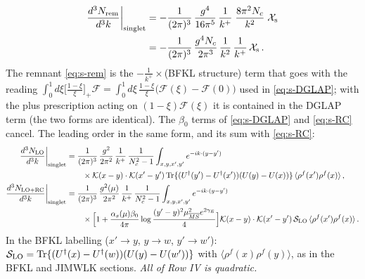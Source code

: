 {\begin{align}
\frac{d^{3}N_{\rm rem}}{d^{3}k}\bigg|_{\rm singlet}&=-\frac{1}{(2\pi)^{3}}\,\frac{g^{4}}{16\pi^{5}}\,\frac{1}{k^{+}}\;\frac{8\pi^{2}N_{c}}{k^{2}}\;\mathcal{X}_{\rm s}\notag\\&=-\frac{1}{(2\pi)^{3}}\,\frac{g^{4}N_{c}}{2\pi^{3}}\,\frac{1}{k^{2}}\,\frac{1}{k^{+}}\,\mathcal{X}_{\rm s}\,.\label{eq:s-rem}
\end{align}
The remnant \eqref{eq:s-rem} is the $-\frac{1}{k^{+}}\times$(BFKL structure) term that goes with the reading $\int_{0}^{1}d\xi\big[\frac{1-\xi}{\xi}\big]_{+}\mathcal{F}=\int_{0}^{1}d\xi\,\frac{1-\xi}{\xi}\big(\mathcal{F}(\xi)-\mathcal{F}(0)\big)$ used in \eqref{eq:s-DGLAP}; with the plus prescription acting on $(1-\xi)\mathcal{F}(\xi)$ it is contained in the DGLAP term (the two forms are identical). The $\beta_{0}$ terms of \eqref{eq:s-DGLAP} and \eqref{eq:s-RC} cancel. The leading order in the same form, and its sum with \eqref{eq:s-RC}:
\begin{align}
\frac{d^{3}N_{\rm LO}}{d^{3}k}\bigg|_{\rm singlet}&=\frac{1}{(2\pi)^{3}}\,\frac{g^{2}}{2\pi^{2}}\,\frac{1}{k^{+}}\,\frac{1}{N_{c}^{2}-1}\int_{x,y,x',y'}e^{-ik\cdot(y-y')}\notag\\&\qquad\times\mathcal{K}(x-y)\cdot\mathcal{K}(x'-y')\,{\rm Tr}\{(U^{\dagger}(y')-U^{\dagger}(x'))(U(y)-U(x))\}\,\langle\rho^{f}(x')\rho^{f}(x)\rangle\,,\label{eq:s-LO}\\
\frac{d^{3}N_{\rm LO+RC}}{d^{3}k}\bigg|_{\rm singlet}&=\frac{1}{(2\pi)^{3}}\,\frac{g^{2}(\mu)}{2\pi^{2}}\,\frac{1}{k^{+}}\,\frac{1}{N_{c}^{2}-1}\int_{x,y,x',y'}e^{-ik\cdot(y-y')}\notag\\&\qquad\times\Big[1+\frac{\alpha_{s}(\mu)\beta_{0}}{4\pi}\log\frac{(y'-y)^{2}\mu^{2}_{\overline{MS}}e^{2\gamma_{E}}}{4}\Big]\mathcal{K}(x-y)\cdot\mathcal{K}(x'-y')\,\mathcal{S}_{\rm LO}\,\langle\rho^{f}(x')\rho^{f}(x)\rangle\,.\notag
\end{align}
In the BFKL labelling ($x'\to y$, $y\to w$, $y'\to w'$): $\mathcal{S}_{\rm LO}={\rm Tr}\{(U^{\dagger}(x)-U^{\dagger}(w))(U(y)-U(w'))\}$ with $\langle\rho^{f}(x)\rho^{f}(y)\rangle$, as in the BFKL and JIMWLK sections. \emph{All of Row IV is quadratic.}

}
